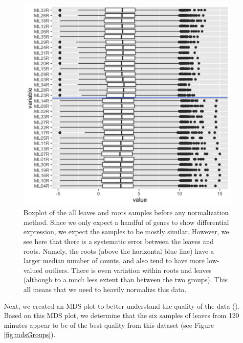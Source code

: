 \documentclass[11pt,a4paper,oldfontcommands,openany]{memoir}
\numberwithin{equation}{section} %
\begin{document}
\begin{figure}[H]
    \begin{framed}
    \centering
    \includegraphics[width=\textwidth]{needNorm}
    \end{framed}
    \caption{Boxplot of the all leaves and roots samples before any normalization method. Since we only expect a handful of genes to show differential expression, we expect the samples to be mostly similar. However, we see here that there is a systematic error between the leaves and roots. Namely, the roots (above the horizontal blue line) have a larger median number of counts, and also tend to have more low-valued outliers. There is even variation within roots and leaves (although to a much less extent than between the two groups). This all means that we need to heavily normalize this data.}
    \label{fig:needNorm}
\end{figure}

Next, we created an MDS plot to better understand the quality of the data (\citealt{limma}). Based on this MDS plot, we determine that the six samples of leaves from 120 minutes appear to be of the best quality from this dataset (see Figure \ref{fig:mdsGroups}).
\end{document}
